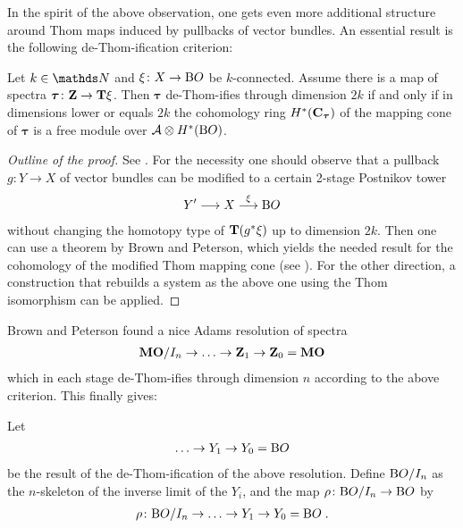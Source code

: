 In the spirit of the above observation, one gets even more additional
structure around Thom maps induced by pullbacks of vector bundles.
An essential result is the following de-Thom-ification criterion:
\begin{Thm*}
  Let $k\in\Nat$ and $\xi\colon X\to\mathrm{B}O$ be $k$-connected.
  Assume there is a map of spectra
  $\bm{\tau}\colon\bm{\mathrm{Z}}\to\bm{\mathrm{T}}{\xi}$.
  Then $\bm{\tau}$ de-Thom-ifies through dimension $2k$ if and only if
  in dimensions lower or equals $2k$ the cohomology ring
  $H^*(\bm{\mathrm{C}}_{\bm{\tau}})$ of the mapping cone of $\bm{\tau}$ is
  a free module over $\mathcal{A}\otimes H^*(\mathrm{B}O)$.  
  \begin{proof}[Outline of the proof]
    See \cite[Theorem~3.5]{immersionconj}.
    For the necessity one should observe that a pullback $g\colon Y\to X$ of
    vector bundles can be modified to a certain 2-stage Postnikov tower
    \begin{gather*}
      Y'\longrightarrow X\overset{\xi}{\longrightarrow}\mathrm{B}O
    \end{gather*}
    without changing the homotopy type of $\bm{\mathrm{T}}{({g}^*\xi)}$ up to
    dimension $2k$.
    Then one can use a theorem by Brown and Peterson, which yields the
    needed result for the cohomology of the modified Thom mapping cone
    (see \cite[Theorem~3.3]{immersionconj}).
    For the other direction, a construction that rebuilds a system as
    the above one using the Thom isomorphism can be applied.
  \end{proof}
\end{Thm*}


Brown and Peterson found a nice Adams resolution of spectra
\begin{gather*}
  \bm{\mathrm{MO}}/I_{n} \to\dotsc \to \bm{\mathrm{Z}}_1 \to \bm{\mathrm{Z}}_0 = \bm{\mathrm{MO}}
\end{gather*}
which in each stage de-Thom-ifies through dimension $n$ according to
the above criterion.
This finally gives:
\begin{Def}
  Let
  \begin{gather*}
    \dotsc \to Y_1 \to Y_0 = \mathrm{B}O
  \end{gather*}
  be the result of the de-Thom-ification of the above resolution.
  Define $\mathrm{B}O/I_{n}$ as the $n$-skeleton of the inverse limit of the
  $Y_i$, and the map $\rho\colon\mathrm{B}O/I_{n}\to\mathrm{B}O$ by
  \begin{gather*}
    \rho\colon\mathrm{B}O/I_{n}\to\dotsc\to Y_1\to Y_0=\mathrm{B}O
    \;.
  \end{gather*}
\end{Def}

